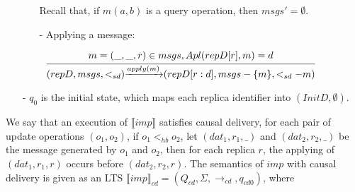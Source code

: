\begin{itemize}
\begin{itemize}
    Recall that, if $m(a,b)$ is a query operation, then $msgs' = \emptyset$.

    \item[-] Applying a message:

    $\begin{array}{l c} \bigfrac{ m = (\_,\_,r) \in msgs,Apl(repD[r],m) = d } {(repD,msgs,<_{sd}) {\xrightarrow{apply(m)}} (repD[r:d],msgs - \{ m \},<_{sd}-m )} \end{array}$
    \end{itemize}

\item[-] $q_0$ is the initial state, which maps each replica identifier into $(InitD,\emptyset)$. 
\end{itemize}

We say that an execution of $\llbracket imp \rrbracket$ satisfies causal delivery, for each pair of update operations $(o_1,o_2)$, if $o_1 <_{hb} o_2$, let $(dat_1,r_1,\_)$ and $(dat_2,r_2,\_)$ be the message generated by $o_1$ and $o_2$, then for each replica $r$, the applying of $(dat_1,r_1,r)$ occurs before $(dat_2,r_2,r)$. The semantics of $imp$ with causal delivery is given as an LTS $\llbracket imp \rrbracket_{cd} = (Q_{cd},\Sigma,\rightarrow_{cd},q_{cd0})$, where

